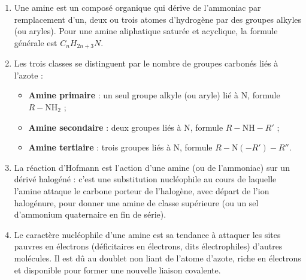 \documentclass[11pt]{article}
\newcommand{\cle}[1]{{\popxbold\color{popdark}#1}}
\begin{document}
\begin{corrige}
\begin{enumerate}
\item Une \cle{amine} est un composé organique qui dérive de l'ammoniac  par remplacement d'un, deux ou trois atomes d'hydrogène par des groupes alkyles (ou aryles). Pour une amine aliphatique saturée et acyclique, la formule générale est $C_nH_{2n+3}N$.
\item Les trois classes se distinguent par le nombre de groupes carbonés liés à l'azote :
\begin{itemize}
\item \textbf{Amine primaire} : un seul groupe alkyle (ou aryle) lié à N, formule $R-\mathrm{NH}_2$ ;
\item \textbf{Amine secondaire} : deux groupes liés à N, formule $R-\mathrm{NH}-R'$ ;
\item \textbf{Amine tertiaire} : trois groupes liés à N, formule $R-\mathrm{N}(-R')-R''$.
\end{itemize}
\item La \cle{réaction d'Hofmann} est l'action d'une amine (ou de l'ammoniac) sur un dérivé halogéné  : c'est une substitution nucléophile au cours de laquelle l'amine attaque le carbone porteur de l'halogène, avec départ de l'ion halogénure, pour donner une amine de classe supérieure (ou un sel d'ammonium quaternaire en fin de série).
\item Le \cle{caractère nucléophile} d'une amine est sa tendance à attaquer les sites pauvres en électrons (déficitaires en électrons, dits électrophiles) d'autres molécules. Il est dû au \cle{doublet non liant} de l'atome d'azote, riche en électrons et disponible pour former une nouvelle liaison covalente.
\end{enumerate}
\end{corrige}
\end{document}
